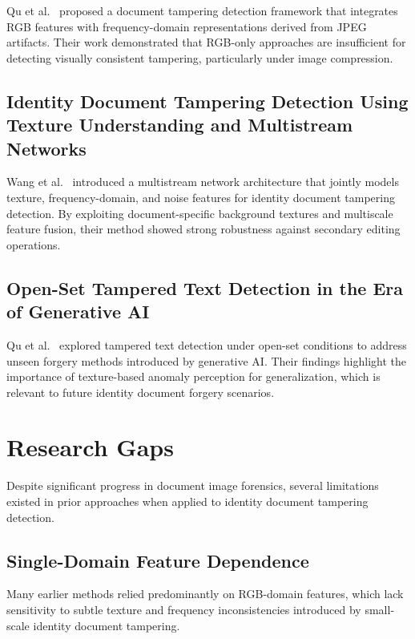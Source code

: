 \documentclass[12pt]{article}
\begin{document}
Qu et al.~\cite{Qu2023DocTamper} proposed a document tampering detection framework that integrates RGB features with frequency-domain representations derived from JPEG artifacts. Their work demonstrated that RGB-only approaches are insufficient for detecting visually consistent tampering, particularly under image compression.

\subsection{Identity Document Tampering Detection Using Texture Understanding and Multistream Networks}

Wang et al.~\cite{Wang2025Identity} introduced a multistream network architecture that jointly models texture, frequency-domain, and noise features for identity document tampering detection. By exploiting document-specific background textures and multiscale feature fusion, their method showed strong robustness against secondary editing operations.

\subsection{Open-Set Tampered Text Detection in the Era of Generative AI}

Qu et al.~\cite{Qu2025OSTF} explored tampered text detection under open-set conditions to address unseen forgery methods introduced by generative AI. Their findings highlight the importance of texture-based anomaly perception for generalization, which is relevant to future identity document forgery scenarios.

\section{Research Gaps}

Despite significant progress in document image forensics, several limitations existed in prior approaches when applied to identity document tampering detection.

\subsection{Single-Domain Feature Dependence}
Many earlier methods relied predominantly on RGB-domain features, which lack sensitivity to subtle texture and frequency inconsistencies introduced by small-scale identity document tampering.
\end{document}
